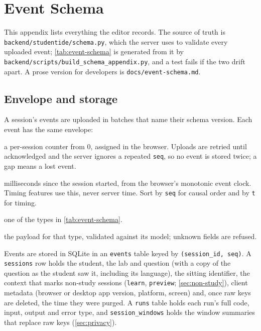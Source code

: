 \chapter{Event Schema}
\label{app:schema}

This appendix lists everything the editor records. The source of truth is
\nolinkurl{backend/studentide/schema.py}, which the server uses to validate every
uploaded event; \cref{tab:event-schema} is generated from it by
\nolinkurl{backend/scripts/build_schema_appendix.py}, and a test fails if the two
drift apart. A prose version for developers is \nolinkurl{docs/event-schema.md}.

\section{Envelope and storage}
A session's events are uploaded in batches that name their schema version. Each
event has the same envelope:
\begin{description}[nosep,font=\ttfamily\mdseries]
  \item[seq] a per-session counter from 0, assigned in the browser. Uploads are
  retried until acknowledged and the server ignores a repeated \texttt{seq}, so
  no event is stored twice; a gap means a lost event.
  \item[t] milliseconds since the session started, from the browser's monotonic
  event clock. Timing features use this, never server time. Sort by
  \texttt{seq} for causal order and by \texttt{t} for timing.
  \item[type] one of the types in \cref{tab:event-schema}.
  \item[data] the payload for that type, validated against its model; unknown
  fields are refused.
\end{description}

Events are stored in SQLite in an \texttt{events} table keyed by
\texttt{(session\_id, seq)}. A \texttt{sessions} row holds the student, the
lab and question (with a copy of the question as the student saw it,
including its language), the sitting identifier, the context that marks non-study sessions
(\texttt{learn}, \texttt{preview}; \cref{sec:non-study}), client metadata
(browser or desktop app version, platform, screen) and, once raw keys are
deleted, the time they were purged. A \texttt{runs} table holds each run's full
code, input, output and error type, and \texttt{session\_windows} holds the
window summaries that replace raw keys (\cref{sec:privacy}).

